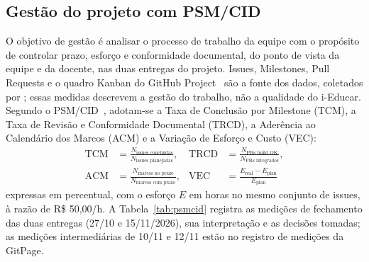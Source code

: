 \documentclass[conference]{model/IEEEtran}%
\begin{document}
\subsection{Gestão do projeto com PSM/CID}\label{sec:psmcid}
O objetivo de gestão é analisar o processo de trabalho da equipe com o propósito de controlar prazo, esforço e conformidade documental, do ponto de vista da equipe e da docente, nas duas entregas do projeto. Issues, Milestones, Pull Requests e o quadro Kanban do GitHub Project~\cite{repo_gracehopper} são a fonte dos dados, coletados por ; essas medidas descrevem a gestão do trabalho, não a qualidade do i-Educar. Segundo o PSM/CID~\cite{mcgarry2002psm}, adotam-se a Taxa de Conclusão por Milestone (TCM), a Taxa de Revisão e Conformidade Documental (TRCD), a Aderência ao Calendário dos Marcos (ACM) e a Variação de Esforço e Custo (VEC):
\begin{equation}\label{eq:psmcid}
\begin{aligned}
\text{TCM} &= \tfrac{N_{\text{issues concluídas}}}{N_{\text{issues planejadas}}}, &
\text{TRCD} &= \tfrac{N_{\text{PRs build OK}}}{N_{\text{PRs integrados}}}, \\
\text{ACM} &= \tfrac{N_{\text{marcos no prazo}}}{N_{\text{marcos com prazo}}}, &
\text{VEC} &= \tfrac{E_{\text{real}} - E_{\text{plan}}}{E_{\text{plan}}}
\end{aligned}
\end{equation}
expressas em percentual, com o esforço $E$ em horas no mesmo conjunto de issues, à razão de R\$ 50,00/h. A Tabela~\ref{tab:psmcid} registra as medições de fechamento das duas entregas (27/10 e 15/11/2026), sua interpretação e as decisões tomadas; as medições intermediárias de 10/11 e 12/11 estão no registro de medições da GitPage.
\end{document}
